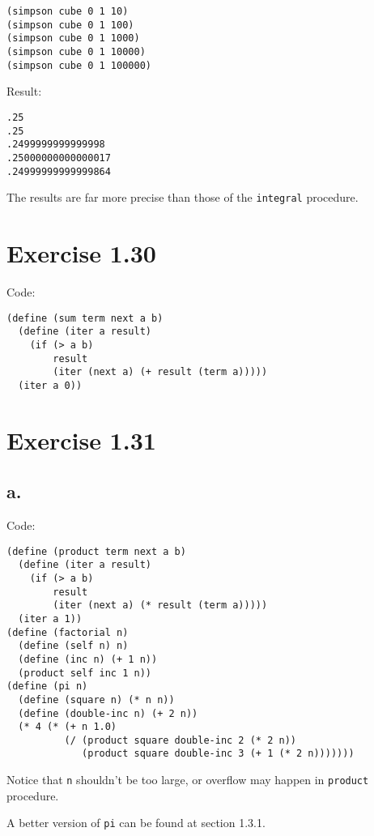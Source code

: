\documentclass[../main.tex]{subfiles}
\begin{document}
\begin{lstlisting}
(simpson cube 0 1 10)
(simpson cube 0 1 100)
(simpson cube 0 1 1000)
(simpson cube 0 1 10000)
(simpson cube 0 1 100000)
\end{lstlisting}

Result:

\begin{lstlisting}
.25
.25
.2499999999999998
.25000000000000017
.24999999999999864
\end{lstlisting}

The results are far more precise than
 those of the \lstinline{integral}
 procedure.

\section{Exercise 1.30}

Code:

\begin{lstlisting}
(define (sum term next a b)
  (define (iter a result)
    (if (> a b)
        result
        (iter (next a) (+ result (term a)))))
  (iter a 0))
\end{lstlisting}

\section{Exercise 1.31}

\subsection*{a.}

Code:

\begin{lstlisting}
(define (product term next a b)
  (define (iter a result)
    (if (> a b)
        result
        (iter (next a) (* result (term a)))))
  (iter a 1))
(define (factorial n)
  (define (self n) n)
  (define (inc n) (+ 1 n))
  (product self inc 1 n))
(define (pi n)
  (define (square n) (* n n))
  (define (double-inc n) (+ 2 n))
  (* 4 (* (+ n 1.0)
          (/ (product square double-inc 2 (* 2 n))
             (product square double-inc 3 (+ 1 (* 2 n)))))))
\end{lstlisting}

Notice that \lstinline{n} shouldn't be
 too large, or overflow may happen in
 \lstinline{product} procedure.

A better version of \lstinline{pi} can
 be found at section 1.3.1.
\end{document}
